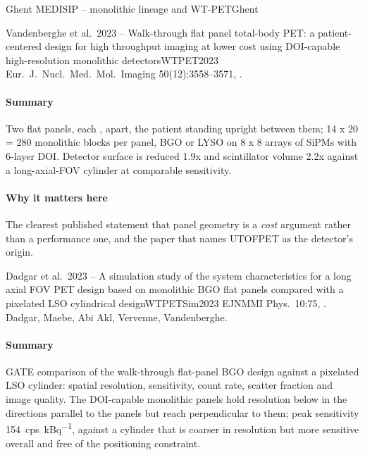 \begin{programnote}{Ghent MEDISIP -- monolithic lineage and WT-PET}{Ghent}
\begin{papernote}{Vandenberghe et al.\ 2023 -- Walk-through flat panel total-body PET: a patient-centered design for high throughput imaging at lower cost using DOI-capable high-resolution monolithic detectors}{WTPET2023}
Eur.\ J.\ Nucl.\ Med.\ Mol.\ Imaging 50(12):3558--3571,
.

\paragraph{Summary}
Two flat panels, each ,  apart,
the patient standing upright between them; 14 x 20 = 280 monolithic blocks
per panel,  BGO or LYSO on 8 x 8
arrays of  SiPMs with 6-layer DOI. Detector
surface is reduced 1.9x and scintillator volume 2.2x against a long-axial-FOV
cylinder at comparable sensitivity. 

\paragraph{Why it matters here}
The clearest published statement that panel geometry is a \emph{cost}
argument rather than a performance one, and the paper that names UTOFPET as
the detector's origin.

\end{papernote}

\begin{papernote}{Dadgar et al.\ 2023 -- A simulation study of the system characteristics for a long axial FOV PET design based on monolithic BGO flat panels compared with a pixelated LSO cylindrical design}{WTPETSim2023}
EJNMMI Phys.\ 10:75, . Dadgar, Maebe, Abi Akl,
Vervenne, Vandenberghe.

\paragraph{Summary}
GATE comparison of the walk-through flat-panel BGO design against a pixelated
LSO cylinder: spatial resolution, sensitivity, count rate, scatter fraction
and image quality. The DOI-capable monolithic panels hold resolution below
 in the directions parallel to the panels but reach 
perpendicular to them; peak sensitivity \qty{154}{cps\per\kilo\becquerel},
against a cylinder that is coarser in resolution but more sensitive overall
and free of the positioning constraint.


\end{papernote}
\end{programnote}

